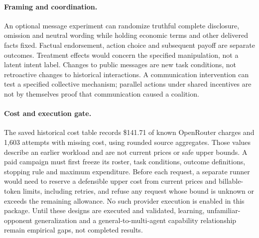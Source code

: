 \paragraph{Framing and coordination.}
An optional message experiment can randomize truthful complete disclosure, omission and neutral wording while holding economic terms and other delivered facts fixed. Factual endorsement, action choice and subsequent payoff are separate outcomes. Treatment effects would concern the specified manipulation, not a latent intent label. Changes to public messages are new task conditions, not retroactive changes to historical interactions. A communication intervention can test a specified collective mechanism; parallel actions under shared incentives are not by themselves proof that communication caused a coalition.

\paragraph{Cost and execution gate.}
The saved historical cost table records \$141.71 of known OpenRouter charges and 1,603 attempts with missing cost, using rounded source aggregates. Those values describe an earlier workload and are not current prices or safe upper bounds. A paid campaign must first freeze its roster, task conditions, outcome definitions, stopping rule and maximum expenditure. Before each request, a separate runner would need to reserve a defensible upper cost from current prices and billable-token limits, including retries, and refuse any request whose bound is unknown or exceeds the remaining allowance. No such provider execution is enabled in this package. Until these designs are executed and validated, learning, unfamiliar-opponent generalization and a general-to-multi-agent capability relationship remain empirical gaps, not completed results.
